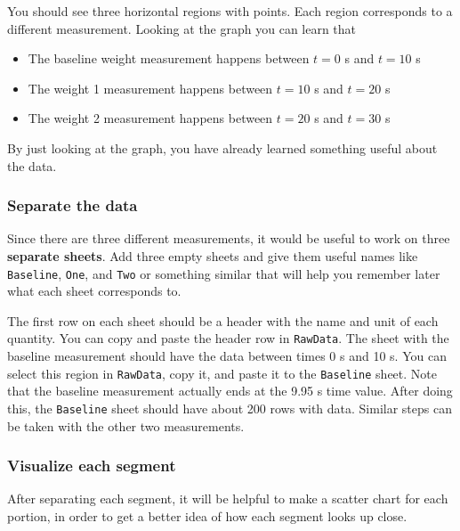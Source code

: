 You should see three horizontal regions with points. Each region corresponds to a different measurement. Looking at the graph you can learn that
\begin{itemize}
    \item The baseline weight measurement happens between $t = 0$ s and $t = 10$ s
    \item The weight 1 measurement happens between $t = 10$ s and $t = 20$ s
    \item The weight 2 measurement happens between $t = 20$ s and $t = 30$ s
\end{itemize}
By just looking at the graph, you have already learned something useful about the data.
\begin{center}
\end{center}
\subsubsection{Separate the data}
Since there are three different measurements, it would be useful to work on three \textbf{separate sheets}. Add three empty sheets and give them useful names like \texttt{Baseline}, \texttt{One}, and \texttt{Two} or something similar that will help you remember later what each sheet corresponds to.

The first row on each sheet should be a header with the name and unit of each quantity. You can copy and paste the header row in \texttt{RawData}. The sheet with the baseline measurement should have the data between times 0 s and 10 s. You can select this region in \texttt{RawData}, copy it, and paste it to the \texttt{Baseline} sheet. Note that the baseline measurement actually ends at the 9.95 s time value. After doing this, the \texttt{Baseline} sheet should have about 200 rows with data. Similar steps can be taken with the other two measurements.
\subsubsection{Visualize each segment}
After separating each segment, it will be helpful to make a scatter chart for each portion, in order to get a better idea of how each segment looks up close.

